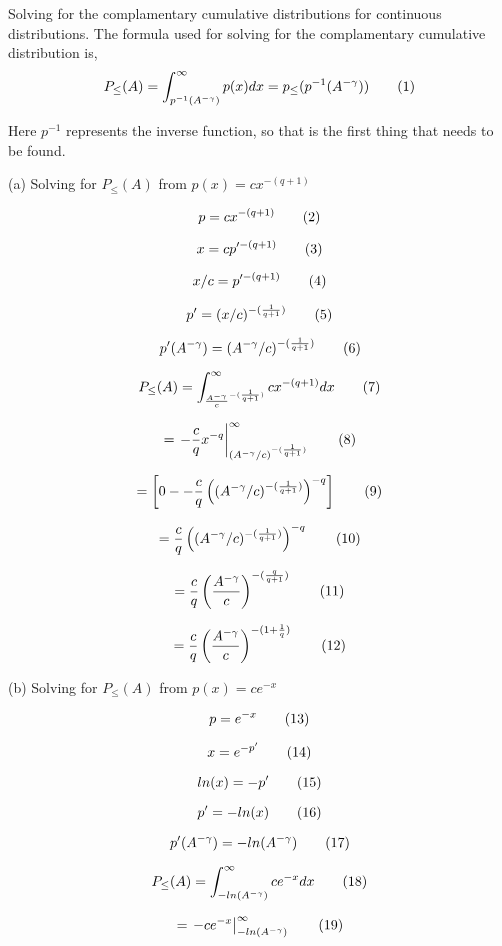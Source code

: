 Solving for the complamentary cumulative distributions for continuous distributions. The formula used for solving for the complamentary cumulative distribution is,
\[
  P_\leq (A)
  =
  \int_{p^{-1}(A^{-\gamma})}^\infty
    p(x)dx
  =
  p_\leq(p^{-1}(A^{-\gamma}))
 \addtag
\]

Here $p^{-1}$ represents the inverse function, so that is the first thing that needs to be found.

(a) Solving for
$P_\leq (A)$
from
$p(x) = cx^{ -(q+1) }$

\[
  p = cx^{ -(q+1) }
  \addtag
\]

\[
  x = cp'^{ -(q+1) }
  \addtag
\]

\[
  x / c
  =
  p'^{ -(q+1) }
  \addtag
\]

\[
  p'
  =
  (x / c)^{-(\frac{1}{q + 1})}
  \addtag
\]

\[
  p'(A^{-\gamma})
  =
  (A^{-\gamma} / c)^{-(\frac{1}{q + 1})}
  \addtag
\]

\[
  P_\leq (A)
  =
  \int_{
    \frac{A^{-\gamma}}{c}
      ^{-(\frac{1}{q + 1})}
    }^\infty
    cx^{ -(q+1) }
    dx
  \addtag
\]

\[
  =
  \left.
  -\frac{c}{q}
   x^{-q}
  \right|_{
    (A^{-\gamma} / c)^{-(\frac{1}{q + 1})}
  }^{
    \infty
  }
  \addtag
\]

\[
  =
  \left[
    0 -
    -\frac{c}{q}
    \left(
      (A^{-\gamma} / c)
        ^{-(\frac{1}{q + 1})}
    \right)^{-q}
  \right]
  \addtag
\]

\[
  =
  \frac{c}{q}
  \left(
    (A^{-\gamma} / c)^{-(\frac{1}{q + 1})}
  \right)^{-q}
  \addtag
\]

\[
  =
  \frac{c}{q}
  \left(
    \frac{A^{-\gamma}}{c}
  \right)
    ^{-(\frac{q}{q + 1})}
  \addtag
\]

\[
  =
  \frac{c}{q}
  \left(
    \frac{A^{-\gamma}}{c}
  \right)
    ^{-(1 + \frac{1}{q})}
  \addtag
\]

(b) Solving for
$P_\leq (A)$
from
$p(x) = ce^{-x}$ 

\[
  p = e^{-x}
  \addtag
\]

\[
  x = e^{-p'}
  \addtag
\]

\[
  ln(x) = -p'
  \addtag
\]

\[
  p' = -ln(x)
  \addtag
\]

\[
  p'(A^{-\gamma}) =
  -ln(A^{-\gamma})
  \addtag
\]

\[
  P_\leq (A)
  =
  \int_{-ln(A^{-\gamma})}^\infty
    ce^{-x}
    dx
  \addtag
\]

\[
  =
  \left.
    -ce^{-x}
  \right|_{-ln(A^{-\gamma})}^{\infty}
  \addtag
\]

